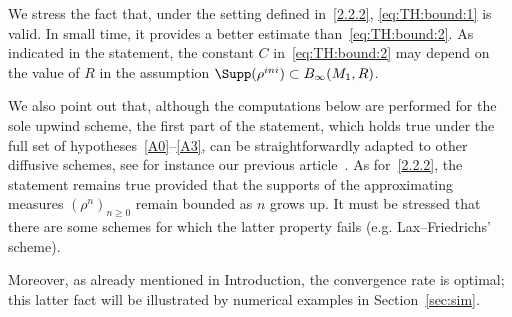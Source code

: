 We stress the fact that, under the setting defined in~\eqref{2.2.2}, \eqref{eq:TH:bound:1} is valid. In small time, it provides a better estimate than~\eqref{eq:TH:bound:2}. As indicated in the statement, the constant $C$ in~\eqref{eq:TH:bound:2} may depend on the value of $R$ in the assumption $\Supp(\rho^{ini}) \subset B_{\infty}(M_{1},R)$.

We also point out that, although the computations below are performed for the sole upwind scheme, the first part of the statement, which holds true under the full set of hypotheses~\eqref{A0}--\eqref{A3}, can be straightforwardly adapted to other diffusive schemes, see for instance our previous article~\cite{DLV}. As for~\eqref{2.2.2}, the statement remains true provided that the supports of the approximating measures $(\rho^n)_{n \geq 0}$ remain bounded as $n$ grows up. It must be stressed that there are some schemes for which the latter property fails (e.g. Lax--Friedrichs' scheme).

Moreover, as already mentioned in Introduction, the convergence rate is optimal; this latter fact will be illustrated by numerical examples in Section~\ref{sec:sim}.

